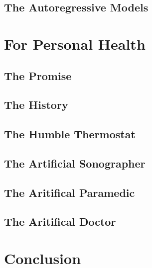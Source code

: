 \newpage
\chapter{The Autoregressive Models}\label{ch:ps-autoregr}


\part{For Personal Health}
\newpage
\chapter{The Promise} \label{ch:health-motiv}


\newpage
\chapter{The History} \label{ch:health-sota}


\newpage
\chapter{The Humble Thermostat} \label{ch:boptest}


\newpage
\chapter{The Artificial Sonographer} \label{ch:imagym}


\newpage
\chapter{The Aritifical Paramedic} \label{ch:virtu-als}


\newpage
\chapter{The Aritifical Doctor} \label{ch:mimicseq}
%

\part{Conclusion}

